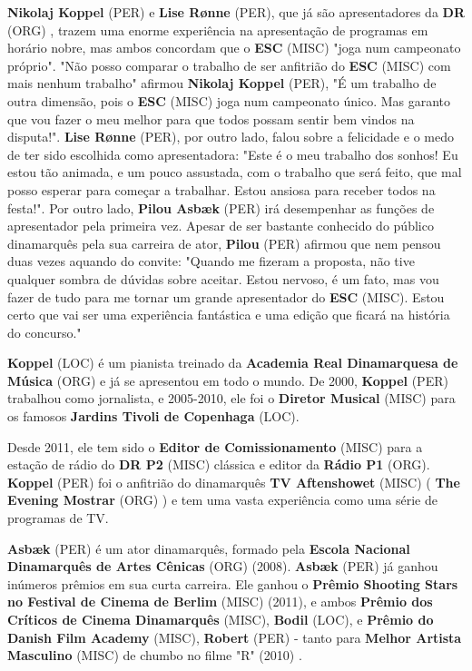 \documentclass[12pt,a4paper]{article}
\begin{document}
\textbf{Nikolaj Koppel} (PER) e \textbf{Lise Rønne} (PER), que já são apresentadores da \textbf{DR} (ORG) , trazem uma enorme experiência na apresentação de programas em horário nobre, mas ambos concordam que o \textbf{ESC} (MISC) "joga num campeonato próprio". "Não posso comparar o trabalho de ser anfitrião do \textbf{ESC} (MISC) com mais nenhum trabalho" afirmou \textbf{Nikolaj Koppel} (PER), "É um trabalho de outra dimensão, pois o \textbf{ESC} (MISC) joga num campeonato único. Mas garanto que vou fazer o meu melhor para que todos possam sentir bem vindos na disputa!". \textbf{Lise Rønne} (PER), por outro lado, falou sobre a felicidade e o medo de ter sido escolhida como apresentadora: "Este é o meu trabalho dos sonhos! Eu estou tão animada, e um pouco assustada, com o trabalho que será feito, que mal posso esperar para começar a trabalhar. Estou ansiosa para receber todos na festa!". Por outro lado, \textbf{Pilou Asbæk} (PER) irá desempenhar as funções de apresentador pela primeira vez. Apesar de ser bastante conhecido do público dinamarquês pela sua carreira de ator, \textbf{Pilou} (PER) afirmou que nem pensou duas vezes aquando do convite: "Quando me fizeram a proposta, não tive qualquer sombra de dúvidas sobre aceitar. Estou nervoso, é um fato, mas vou fazer de tudo para me tornar um grande apresentador do \textbf{ESC} (MISC). Estou certo que vai ser uma experiência fantástica e uma edição que ficará na história do concurso."

\textbf{Koppel} (LOC) é um pianista treinado da \textbf{Academia Real Dinamarquesa de Música} (ORG) e já se apresentou em todo o mundo. De 2000, \textbf{Koppel} (PER) trabalhou como jornalista, e 2005-2010, ele foi o \textbf{Diretor Musical} (MISC) para os famosos \textbf{Jardins Tivoli de Copenhaga} (LOC).

Desde 2011, ele tem sido o \textbf{Editor de Comissionamento} (MISC) para a estação de rádio do \textbf{DR P2} (MISC) clássica e editor da \textbf{Rádio P1} (ORG). \textbf{Koppel} (PER) foi o anfitrião do dinamarquês \textbf{TV Aftenshowet} (MISC) ( \textbf{The Evening Mostrar} (ORG) ) e tem uma vasta experiência como uma série de programas de TV.

\textbf{Asbæk} (PER) é um ator dinamarquês, formado pela \textbf{Escola Nacional Dinamarquês de Artes Cênicas} (ORG) (2008). \textbf{Asbæk} (PER) já ganhou inúmeros prêmios em sua curta carreira. Ele ganhou o \textbf{Prêmio Shooting Stars no Festival de Cinema de Berlim} (MISC) (2011), e ambos \textbf{Prêmio dos Críticos de Cinema Dinamarquês} (MISC), \textbf{Bodil} (LOC), e \textbf{Prêmio do Danish Film Academy} (MISC), \textbf{Robert} (PER) - tanto para \textbf{Melhor Artista Masculino} (MISC) de chumbo no filme "R" (2010) .
\end{document}
